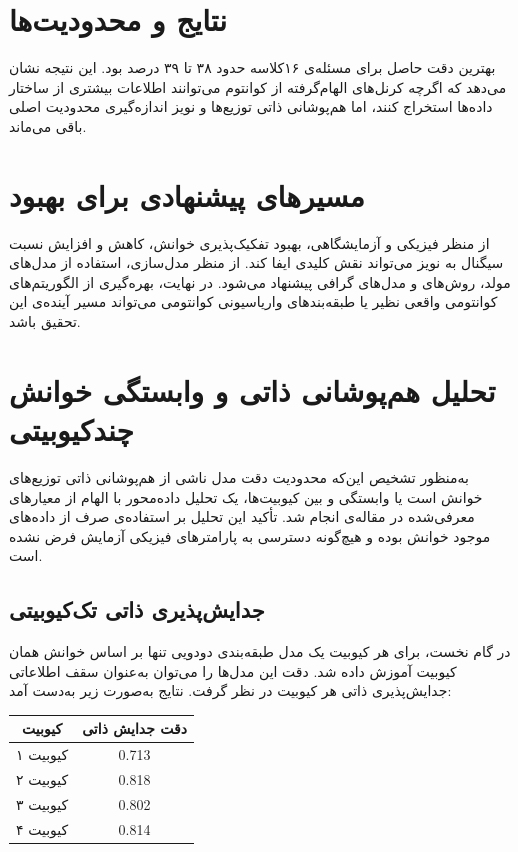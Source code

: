 \section{نتایج و محدودیت‌ها}
بهترین دقت حاصل برای مسئله‌ی ۱۶کلاسه حدود ۳۸ تا ۳۹ درصد بود. این نتیجه نشان می‌دهد که اگرچه کرنل‌های الهام‌گرفته از کوانتوم می‌توانند اطلاعات بیشتری از ساختار داده‌ها استخراج کنند، اما هم‌پوشانی ذاتی توزیع‌ها و نویز اندازه‌گیری محدودیت اصلی باقی می‌ماند.

\section{مسیرهای پیشنهادی برای بهبود}
از منظر فیزیکی و آزمایشگاهی، بهبود تفکیک‌پذیری خوانش، کاهش  و افزایش نسبت سیگنال به نویز می‌تواند نقش کلیدی ایفا کند. از منظر مدل‌سازی، استفاده از مدل‌های مولد، روش‌های  و مدل‌های گرافی پیشنهاد می‌شود. در نهایت، بهره‌گیری از الگوریتم‌های کوانتومی واقعی نظیر  یا طبقه‌بندهای واریاسیونی کوانتومی می‌تواند مسیر آینده‌ی این تحقیق باشد.


\section{تحلیل هم‌پوشانی ذاتی و وابستگی خوانش چندکیوبیتی}
به‌منظور تشخیص این‌که محدودیت دقت مدل ناشی از هم‌پوشانی ذاتی توزیع‌های خوانش است یا وابستگی و  بین کیوبیت‌ها، یک تحلیل داده‌محور با الهام از معیارهای معرفی‌شده در مقاله‌ی
انجام شد. تأکید این تحلیل بر استفاده‌ی صرف از داده‌های موجود خوانش بوده و هیچ‌گونه دسترسی به پارامترهای فیزیکی آزمایش فرض نشده است.

\subsection{جدایش‌پذیری ذاتی تک‌کیوبیتی}
در گام نخست، برای هر کیوبیت یک مدل طبقه‌بندی دودویی تنها بر اساس خوانش همان کیوبیت آموزش داده شد. دقت این مدل‌ها را می‌توان به‌عنوان سقف اطلاعاتی جدایش‌پذیری ذاتی هر کیوبیت در نظر گرفت. نتایج به‌صورت زیر به‌دست آمد:
\begin{center}
	\begin{tabular}{c c}
		\hline
		کیوبیت & دقت جدایش ذاتی \\
		\hline
		کیوبیت ۱ & 0.713 \\
		کیوبیت ۲ & 0.818 \\
		کیوبیت ۳ & 0.802 \\
		کیوبیت ۴ & 0.814 \\
		\hline
	\end{tabular}
\end{center}

